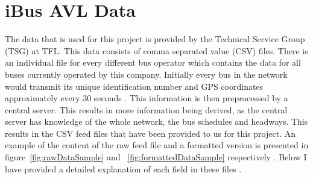 \section{iBus AVL Data}
The data that is used for this project is provided by the Technical Service Group (TSG) at TFL. This data consists of comma separated value (CSV) files. There is an individual file for every different bus operator which contains the data for all buses currently operated by this company. Initially every bus in the network would transmit its unique identification number and GPS coordinates approximately every 30 seconds \cite{Hounsell201276}. This information is then preprocessed by a central server. This results in more information being derived, as the central server has knowledge of the whole network, the bus schedules and headways. This results in the CSV feed files that have been provided to us for this project. An example of the content of the raw feed file and a formatted version is presented in figure~\ref{fig:rawDataSample} and ~\ref{fig:formattedDataSample} respectively . Below I have provided a detailed explanation of each field in these files \cite{infoBusesInservice}.
